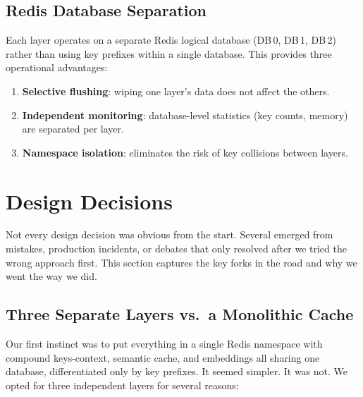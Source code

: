 \documentclass[conference]{IEEEtran}
\begin{document}
\subsection{Redis Database Separation}

Each layer operates on a separate Redis logical database (DB\,0, DB\,1, DB\,2) rather than using key prefixes within a single database. This provides three operational advantages:

\begin{enumerate}
\item \textbf{Selective flushing}: wiping one layer's data does not affect the others.
\item \textbf{Independent monitoring}: database-level statistics (key counts, memory) are separated per layer.
\item \textbf{Namespace isolation}: eliminates the risk of key collisions between layers.
\end{enumerate}

\section{Design Decisions}
\label{sec:design}

Not every design decision was obvious from the start. Several emerged from mistakes, production incidents, or debates that only resolved after we tried the wrong approach first. This section captures the key forks in the road and why we went the way we did.

\subsection{Three Separate Layers vs.\ a Monolithic Cache}

Our first instinct was to put everything in a single Redis namespace with compound keys-context, semantic cache, and embeddings all sharing one database, differentiated only by key prefixes. It seemed simpler. It was not. We opted for three independent layers for several reasons:
\end{document}
